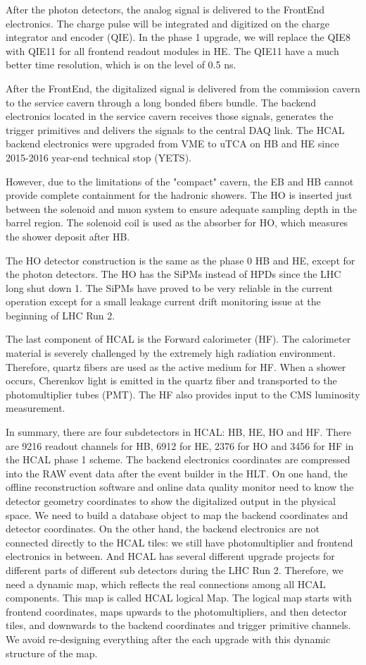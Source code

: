 After the photon detectors, the analog signal is delivered to the FrontEnd electronics. The charge pulse will be integrated and digitized on the charge integrator and encoder (QIE). In the phase 1 upgrade, we will replace the QIE8 with QIE11 for all frontend readout modules in HE. The QIE11 have a much better time resolution, which is on the level of 0.5 ns. 

After the FrontEnd, the digitalized signal is delivered from the commission cavern to the service cavern through a long bonded fibers bundle. The backend electronics located in the service cavern receives those signals, generates the trigger primitives and delivers the signals to the central DAQ link. The HCAL backend electronics were upgraded from VME to uTCA on HB and HE since 2015-2016 year-end technical stop (YETS)\cite{CMS:2012tda}. 

However, due to the limitations of the "compact" cavern, the EB and HB cannot provide complete containment for the hadronic showers. The HO is inserted just between the solenoid and muon system to ensure adequate sampling depth in the barrel region. The solenoid coil is used as the absorber for HO, which measures the shower deposit after HB. 

The HO detector construction is the same as the phase 0 HB and HE, except for the photon detectors. The HO has the SiPMs instead of HPDs since the LHC long shut down 1. The SiPMs have proved to be very reliable in the current operation except for a small leakage current drift monitoring issue at the beginning of LHC Run 2. 

The last component of HCAL is the Forward calorimeter (HF). The calorimeter material is severely challenged by the extremely high radiation environment. Therefore, quartz fibers are used as the active medium for HF. When a shower occurs, Cherenkov light is emitted in the quartz fiber and transported to the photomultiplier tubes (PMT). The HF also provides input to the CMS luminosity measurement. 

In summary, there are four subdetectors in HCAL: HB, HE, HO and HF. There are 9216 readout channels for HB, 6912 for HE, 2376 for HO and 3456 for HF in the HCAL phase 1 scheme. The backend electronics coordinates are compressed into the RAW event data after the event builder in the HLT. On one hand, the offline reconstruction software and online data quality monitor need to know the detector geometry coordinates to show the digitalized output in the physical space. We need to build a database object to map the backend coordinates and detector coordinates. On the other hand, the backend electronics are not connected directly to the HCAL tiles: we still have photomultiplier and frontend electronics in between. And HCAL has several different upgrade projects for different parts of different sub detectors during the LHC Run 2. Therefore, we need a dynamic map, which reflects the real connections among all HCAL components. This map is called HCAL logical Map. The logical map starts with frontend coordinates, maps upwards to the photomultipliers, and then detector tiles, and downwards to the backend coordinates and trigger primitive channels. We avoid re-designing everything after the each upgrade with this dynamic structure of the map. 

